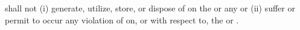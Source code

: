 \label{sec:env-responsibility}
\lessee shall not (i) generate, utilize, store, or dispose of on the \premises or \building any \hazardousSubstances or (ii) suffer or permit to occur any violation of \environmentalLaws on, or with respect to, the \premises or \building.
